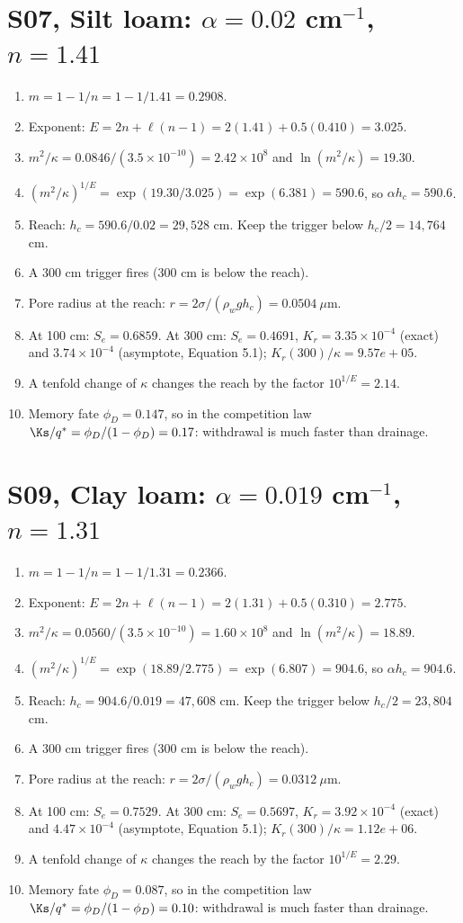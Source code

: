 \section{S07, Silt loam: $\alpha=0.02$ cm$^{-1}$, $n=1.41$}
\begin{enumerate}[leftmargin=*,itemsep=1pt]
\item $m=1-1/n=1-1/1.41=0.2908$.
\item Exponent: $E=2n+\ell(n-1)=2(1.41)+0.5(0.410)=3.025$.
\item $m^2/\kappa=0.0846/(3.5\times10^{-10})=2.42\times10^{8}$ and $\ln(m^2/\kappa)=19.30$.
\item $(m^2/\kappa)^{1/E}=\exp(19.30/3.025)=\exp(6.381)=590.6$, so $\alpha h_c=590.6$.
\item Reach: $h_c=590.6/0.02=29,528$ cm. Keep the trigger below $h_c/2=14,764$ cm.
\item A 300 cm trigger fires (300 cm is below the reach).
\item Pore radius at the reach: $r=2\sigma/(\rho_wgh_c)=0.0504\ \mu$m.
\item At 100 cm: $S_e=0.6859$. At 300 cm: $S_e=0.4691$, $K_r=3.35\times10^{-4}$ (exact) and $3.74\times10^{-4}$ (asymptote, Equation 5.1); $K_r(300)/\kappa=9.57e+05$.
\item A tenfold change of $\kappa$ changes the reach by the factor $10^{1/E}=2.14$.
\item Memory fate $\phi_D=0.147$, so in the competition law $\Ks/q^*=\phi_D/(1-\phi_D)=0.17$: withdrawal is much faster than drainage.
\end{enumerate}
\section{S09, Clay loam: $\alpha=0.019$ cm$^{-1}$, $n=1.31$}
\begin{enumerate}[leftmargin=*,itemsep=1pt]
\item $m=1-1/n=1-1/1.31=0.2366$.
\item Exponent: $E=2n+\ell(n-1)=2(1.31)+0.5(0.310)=2.775$.
\item $m^2/\kappa=0.0560/(3.5\times10^{-10})=1.60\times10^{8}$ and $\ln(m^2/\kappa)=18.89$.
\item $(m^2/\kappa)^{1/E}=\exp(18.89/2.775)=\exp(6.807)=904.6$, so $\alpha h_c=904.6$.
\item Reach: $h_c=904.6/0.019=47,608$ cm. Keep the trigger below $h_c/2=23,804$ cm.
\item A 300 cm trigger fires (300 cm is below the reach).
\item Pore radius at the reach: $r=2\sigma/(\rho_wgh_c)=0.0312\ \mu$m.
\item At 100 cm: $S_e=0.7529$. At 300 cm: $S_e=0.5697$, $K_r=3.92\times10^{-4}$ (exact) and $4.47\times10^{-4}$ (asymptote, Equation 5.1); $K_r(300)/\kappa=1.12e+06$.
\item A tenfold change of $\kappa$ changes the reach by the factor $10^{1/E}=2.29$.
\item Memory fate $\phi_D=0.087$, so in the competition law $\Ks/q^*=\phi_D/(1-\phi_D)=0.10$: withdrawal is much faster than drainage.
\end{enumerate}
